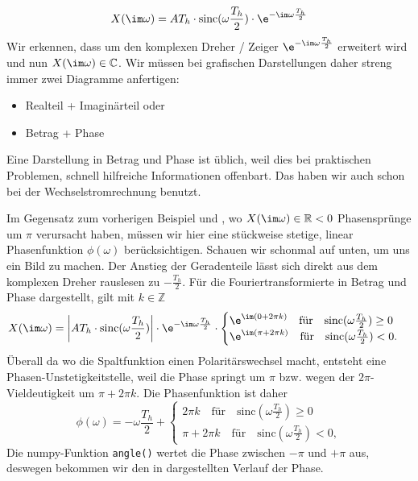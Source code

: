\begin{Loesung}
\begin{equation}
\label{eq:A8A2DEE53A_Loesung}
X(\im \omega) = A T_h \cdot \mathrm{sinc}(\omega\frac{T_h}{2}) \cdot  \e^{-\im\omega\frac{T_h}{2}}
\end{equation}
%
Wir erkennen, dass  um den komplexen Dreher / Zeiger $\e^{-\im\omega\frac{T_h}{2}}$
erweitert wird und nun $X(\im \omega)\in\mathbb{C}$.
%
Wir müssen bei grafischen Darstellungen daher streng immer zwei Diagramme anfertigen:
\begin{itemize}
  \item Realteil + Imaginärteil oder
  \item Betrag + Phase
\end{itemize}
%
Eine Darstellung in Betrag und Phase ist üblich, weil dies bei praktischen
Problemen, schnell hilfreiche Informationen offenbart. Das haben wir auch schon
bei der Wechselstromrechnung benutzt.


Im Gegensatz zum vorherigen Beispiel und ,
wo $X(\im \omega)\in\mathbb{R}<0$ Phasensprünge um $\pi$ verursacht haben, müssen
wir hier eine stückweise stetige, linear Phasenfunktion $\phi(\omega)$ berücksichtigen.
Schauen wir schonmal auf  unten, um uns ein Bild zu machen.
%
Der Anstieg der Geradenteile lässt sich direkt aus dem komplexen Dreher rauslesen
zu $-\frac{T_h}{2}$.
%
Für die Fouriertransformierte in Betrag und Phase dargestellt, gilt mit $k\in\mathbb{Z}$
\begin{equation}
X(\im \omega) = \bigg|A T_h \cdot \mathrm{sinc}(\omega\frac{T_h}{2})\bigg|
\cdot  \e^{-\im\omega\frac{T_h}{2}}\cdot
\begin{cases}
\e^{\im (0+2\pi k)}\quad \text{für}\quad \mathrm{sinc}(\omega\frac{T_h}{2})\geq0\\
\e^{\im (\pi + 2\pi k)}\quad \text{für}\quad\mathrm{sinc}(\omega\frac{T_h}{2})<0.
\end{cases}
\end{equation}
Überall da wo die Spaltfunktion einen Polaritärswechsel macht, entsteht
eine Phasen-Unstetigkeitstelle, weil die Phase springt um $\pi$ bzw. wegen der
$2\pi$-Vieldeutigkeit um $\pi + 2\pi k$.
%
Die Phasenfunktion ist daher
\begin{equation}
\phi(\omega) = -\omega\frac{T_h}{2} +
\begin{cases}
2\pi k\quad \text{für}\quad \mathrm{sinc}(\omega\frac{T_h}{2})\geq0\\
\pi + 2\pi k\quad \text{für}\quad\mathrm{sinc}(\omega\frac{T_h}{2})<0,
\end{cases}
\end{equation}
Die numpy-Funktion \verb|angle()| wertet die Phase zwischen $-\pi$ und $+\pi$ aus,
deswegen bekommen wir den in  dargestellten Verlauf der Phase.


\end{Loesung}
